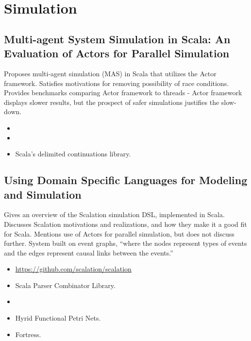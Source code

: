 \chapter {Simulation}

\section {Multi-agent System Simulation in Scala: An Evaluation of Actors for
Parallel Simulation \cite{todd2011multi}}
Proposes multi-agent simulation (MAS) in Scala that utilizes the Actor
framework. Satisfies motivations for removing possibility of race conditions.
Provides benchmarks comparing Actor framework to threads - Actor framework
displays slower results, but the prospect of safer simulations justifies the
slow-down.
\begin{itemize}
    \item {}
    \item {}
    \item Scala's delimited continuations library.
\end{itemize}

\section {Using Domain Specific Languages for Modeling and Simulation \cite{miller2010using}}
Gives an overview of the Scalation simulation DSL, implemented in Scala.
Discusses Scalation motivations and realizations, and how they make it a good
fit for Scala. Mentions use of Actors for parallel simulation, but does not
discuss further. System built on event graphs, ``where the nodes represent types
of events and the edges represent causal links between the events.''
\begin{itemize}
    \item \href{https://github.com/scalation/scalation}{https://github.com/scalation/scalation}
    \item Scala Parser Combinator Library.
    \item {}
    \item Hyrid Functional Petri Nets.
    \item Fortress.
\end{itemize}